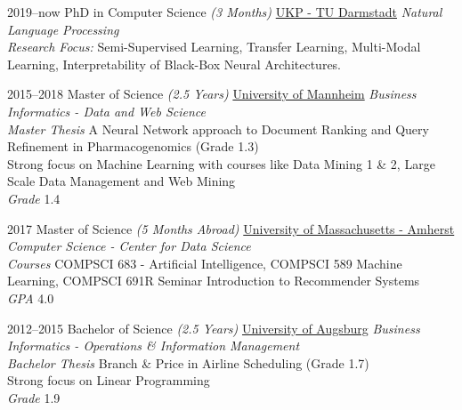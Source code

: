 \documentclass[hidelinks]{cv-style}          %
\begin{document}
\begin{entrylist}

\entry
{2019--now}
{PhD {\normalfont in Computer Science \emph{(3 Months)}}}
{\href{https://www.informatik.tu-darmstadt.de/ukp/ukp_home/index.en.jsp}{UKP - TU Darmstadt}}
{\textit{Natural Language Processing} \\ 
\textit{Research Focus:} Semi-Supervised Learning, Transfer Learning, Multi-Modal Learning, Interpretability of Black-Box Neural Architectures. 
}

\entry
{2015--2018}
{Master {\normalfont of Science \emph{(2.5 Years)}}}
{\href{https://www.wim.uni-mannheim.de/de/fakultaet/}{University of Mannheim}}
{\emph{Business Informatics - Data and Web Science} \\ 
\emph{Master Thesis} A Neural Network approach to Document Ranking and Query Refinement in Pharmacogenomics (Grade 1.3) \\
Strong focus on Machine Learning with courses like Data Mining 1 \& 2, Large Scale Data Management and Web Mining\\
\emph{Grade} 1.4}


\entry
{2017}
{Master {\normalfont of Science \emph{(5 Months Abroad)}}}
{\href{https://www.cics.umass.edu}{University of Massachusetts - Amherst}}
{\emph{Computer Science - Center for Data Science} \\ 
\emph{Courses} COMPSCI 683 - Artificial Intelligence, COMPSCI 589 Machine Learning, COMPSCI 691R Seminar Introduction to Recommender Systems \\
\emph{GPA} 4.0}


\entry
{2012--2015}
{Bachelor {\normalfont of Science \emph{(2.5 Years)}}}
{\href{http://www.wiwi.uni-augsburg.de/studium/studiengaenge/win/}{University of Augsburg}}
{\emph{Business Informatics - Operations \& Information Management} \\ 
\emph{Bachelor Thesis} Branch \& Price in Airline Scheduling (Grade 1.7)\\
Strong focus on Linear Programming \\
\emph{Grade} 1.9
 }


\end{entrylist}
\end{document}
